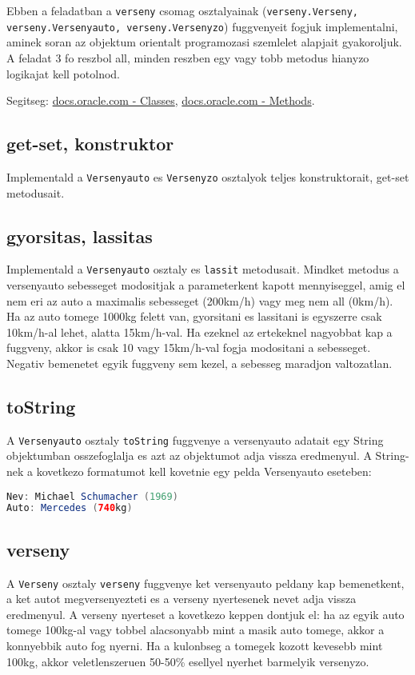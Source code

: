 \documentclass{article}
\begin{document}
Ebben a feladatban a \lstinline{verseny} csomag osztalyainak (\lstinline|verseny.Verseny,|\\\lstinline|verseny.Versenyauto, verseny.Versenyzo|) fuggvenyeit fogjuk implementalni, aminek soran az objektum orientalt programozasi szemlelet alapjait gyakoroljuk. A feladat 3 fo reszbol all, minden reszben egy vagy tobb metodus hianyzo logikajat kell potolnod.


Segitseg: \href{https://docs.oracle.com/javase/tutorial/java/javaOO/classes.html}{docs.oracle.com - Classes}, \href{https://docs.oracle.com/javase/tutorial/java/javaOO/methods.html}{docs.oracle.com - Methods}.

\subsection{get-set, konstruktor}
Implementald a \lstinline{Versenyauto} es \lstinline{Versenyzo} osztalyok teljes konstruktorait, get-set metodusait.

\subsection{gyorsitas, lassitas}
Implementald a \lstinline{Versenyauto} osztaly  es \lstinline{lassit} metodusait. Mindket metodus a versenyauto sebesseget modositjak a parameterkent kapott mennyiseggel, amig el nem eri az auto a maximalis sebesseget (200km/h) vagy meg nem all (0km/h). Ha az auto tomege 1000kg felett van, gyorsitani es lassitani is egyszerre csak 10km/h-al lehet, alatta 15km/h-val. Ha ezeknel az ertekeknel nagyobbat kap a fuggveny, akkor is csak 10 vagy 15km/h-val fogja modositani a sebesseget. Negativ bemenetet egyik fuggveny sem kezel, a sebesseg maradjon valtozatlan.

\subsection{toString}
A \lstinline{Versenyauto} osztaly \lstinline{toString} fuggvenye a versenyauto adatait egy String objektumban osszefoglalja es azt az objektumot adja vissza eredmenyul. A String-nek a kovetkezo formatumot kell kovetnie egy pelda Versenyauto eseteben:

\begin{lstlisting}[language=Java, caption=Pelda toString kimenet]
Nev: Michael Schumacher (1969)
Auto: Mercedes (740kg)
\end{lstlisting}

\subsection{verseny}
A \lstinline{Verseny} osztaly \lstinline{verseny} fuggvenye ket versenyauto peldany kap bemenetkent, a ket autot megversenyezteti es a verseny nyertesenek nevet adja vissza eredmenyul. A verseny nyerteset a kovetkezo keppen dontjuk el: ha az egyik auto tomege 100kg-al vagy tobbel alacsonyabb mint a masik auto tomege, akkor a konnyebbik auto fog nyerni. Ha a kulonbseg a tomegek kozott kevesebb mint 100kg, akkor veletlenszeruen 50-50\% esellyel nyerhet barmelyik versenyzo.
\end{document}
